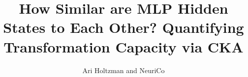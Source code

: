 \documentclass{article}
\title{How Similar are MLP Hidden States to Each Other? Quantifying Transformation Capacity via CKA}
\author{Ari Holtzman and NeuriCo}
\begin{document}
\maketitle

\begin{abstract}

\end{abstract}









\end{document}
